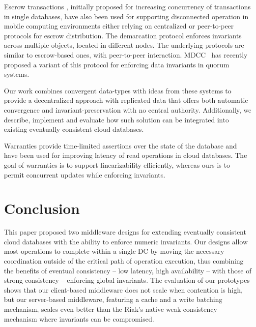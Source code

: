 \documentclass[conference]{IEEEtran}
\begin{document}
Escrow transactions \cite{escrow}, initially
proposed for increasing concurrency of transactions in single databases, have also been
used for supporting disconnected operation in mobile computing environments 
either relying on centralized \cite{mobisnap,Walborn95Semantics} or peer-to-peer \cite{exo-leasing} 
protocols for escrow distribution. 
The demarcation protocol \cite{demarcation} enforces invariants across multiple objects,
located in different nodes.
The underlying protocols are similar to escrow-based ones, with peer-to-peer interaction. 
MDCC~\cite{mdcc} has recently proposed a variant of this protocol
for enforcing data invariants in quorum systems.

Our work combines convergent data-types \cite{crdts} with ideas from 
these systems to provide a decentralized approach with replicated data that offers
both automatic convergence and invariant-preservation with no central authority.
Additionally, we describe, implement and evaluate how such solution can be integrated into
existing eventually consistent cloud databases.




Warranties \cite{warranties} provide time-limited assertions over the state of the database
and have been used for improving latency of read operations in cloud databases.
The goal of warranties is to support linearizability efficiently, whereas ours is
to permit concurrent updates while enforcing invariants.








\section{Conclusion}\label{sec:conclusions}

This paper proposed two middleware designs for extending eventually consistent
cloud databases with the ability to enforce numeric invariants.
Our designs allow most operations to complete within a single DC by moving
the necessary coordination outside of the critical
path of operation execution, thus combining 
the benefits of eventual consistency -- low latency, high availability --
with those of strong consistency -- enforcing global invariants.
The evaluation of our prototypes shows that our client-based middleware 
does not scale when contention is high, 
but our server-based middleware, featuring a cache and a write batching mechanism,
scales even better than the Riak's native 
weak consistency mechanism where invariants can be compromised.
\end{document}

